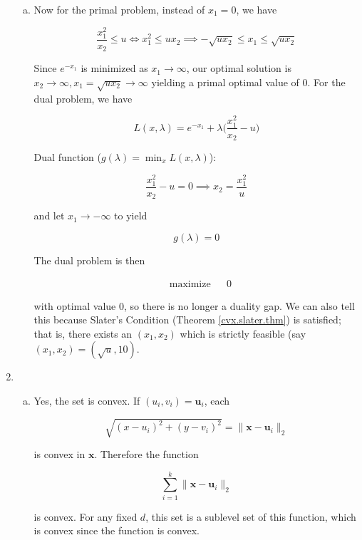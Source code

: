 \begin{enumerate}[(1)]
\begin{enumerate}[(a)]
\item Now for the primal problem, instead of \(x_1 = 0\), we have

\[
\frac{x_1^2}{x_2} \leq u \iff x_1^2 \leq u x_2 \implies -\sqrt{u x_2} \leq x_1 \leq \sqrt{u x_2}
\]

Since \(e^{-x_1}\) is minimized as \(x_1 \to \infty\), our optimal solution is \(x_2 \to \infty, x_1 = \sqrt{u x_2} \to \infty\) yielding a primal optimal value of \(\boxed{0}\). For the dual problem, we have 

\[
L(x, \lambda) = e^{-x_1} + \lambda \bigg( \frac{x_1^2}{x_2} - u \bigg)
\]

Dual function (\( g(\lambda) = \min_x L(x, \lambda)\)):

\[
\frac{x_1^2}{x_2} - u = 0 \implies x_2 = \frac{x_1^2}{u}
\]

and let \(x_1 \to - \infty\) to yield

\[
g(\lambda) = 0
\]

The dual problem is then

\[
\boxed{
\begin{aligned}
& {\text{maximize}}
& & 0 
\end{aligned}}
\]

with optimal value 0, so there is no longer a duality gap. We can also tell this because Slater's Condition (Theorem \ref{cvx.slater.thm}) is satisfied; that is, there exists an \((x_1, x_2)\) which is strictly feasible (say \((x_1, x_2) = (\sqrt{u}, 10)\). 

\end{enumerate}



\item

\begin{enumerate}[(a)]

\item Yes, the set is convex. If \((u_i, v_i) = \boldsymbol{u}_i\), each 

\[
\sqrt{(x - u_i)^2 + (y- v_i)^2} = \lVert \boldsymbol{x} - \boldsymbol{u}_i \rVert_2
\]

is convex in \(\boldsymbol{x}\). Therefore the function

\[
\sum_{i=1}^k \lVert \boldsymbol{x} - \boldsymbol{u}_i \rVert_2
\]

is convex. For any fixed \(d\), this set is a sublevel set of this function, which is convex since the function is convex.


\end{enumerate}
\end{enumerate}
